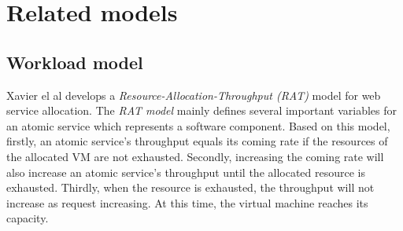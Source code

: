 





\section{Related models}
\subsection{Workload model}
Xavier el al \cite{Service_1} develops a \textit{Resource-Allocation-Throughput (RAT)} model for web service allocation. The \textit{RAT model} mainly defines several important variables for an atomic service which represents a software component. Based on this model, firstly, an atomic service's throughput equals its coming rate if the resources of the allocated VM are not exhausted. Secondly, increasing the coming rate will also increase an atomic service's throughput until the allocated resource is exhausted. Thirdly, when the resource is exhausted, the throughput will not increase as request increasing. At this time, the virtual machine reaches its capacity. 

